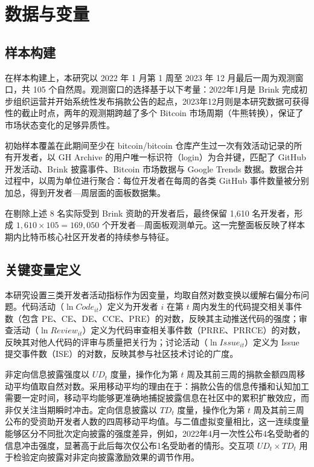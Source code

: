 \documentclass[
    type = master, %
    degree = professional,        %
    decl-page,  %
    twoside,                %
    fontset = fandol %
  ]{njuthesis}
\begin{document}
\section{数据与变量}
\label{sec:data-1}

\subsection{样本构建}

在样本构建上，本研究以 2022 年 1 月第 1 周至 2023 年 12 月最后一周为观测窗口，共 105 个自然周。观测窗口的选择基于以下考量：2022年1月是 Brink 完成初步组织运营并开始系统性发布捐款公告的起点，2023年12月则是本研究数据可获得性的截止时点，两年的观测期跨越了多个 Bitcoin 市场周期（牛熊转换），保证了市场状态变化的足够异质性。

初始样本覆盖在此期间至少在 bitcoin/bitcoin 仓库产生过一次有效活动记录的所有开发者，以 GH Archive 的用户唯一标识符（login）为合并键，匹配了 GitHub 开发活动、Brink 披露事件、Bitcoin 市场数据与 Google Trends 数据。数据合并过程中，以周为单位进行聚合：每位开发者在每周的各类 GitHub 事件数量被分别加总，得到开发者—周层面的面板数据集。

在剔除上述 8 名实际受到 Brink 资助的开发者后，最终保留 1,610 名开发者，形成 $1{,}610 \times 105 = 169{,}050$ 个开发者—周面板观测单元。这一完整面板反映了样本期内比特币核心社区开发者的持续参与特征。

\subsection{关键变量定义}

本研究设置三类开发者活动指标作为因变量，均取自然对数变换以缓解右偏分布问题。代码活动（$\ln\mathit{Code}_{it}$）定义为开发者 $i$ 在第 $t$ 周内发生的代码提交相关事件数（包含 PE、CE、DE、CCE、PRE）的对数，反映其主动推送代码的强度；审查活动（$\ln\mathit{Review}_{it}$）定义为代码审查相关事件数（PRRE、PRRCE）的对数，反映其对他人代码的评审与质量把关行为；讨论活动（$\ln\mathit{Issue}_{it}$）定义为 Issue 提交事件数（ISE）的对数，反映其参与社区技术讨论的广度。

非定向信息披露强度以 $\mathit{UD}_t$ 度量，操作化为第 $t$ 周及其前三周的捐款金额四周移动平均值取自然对数。采用移动平均的理由在于：捐款公告的信息传播和认知加工需要一定时间，移动平均能够更准确地捕捉披露信息在社区中的累积扩散效应，而非仅关注当期瞬时冲击。定向信息披露以 $\mathit{TD}_t$ 度量，操作化为第 $t$ 周及其前三周公布的受资助开发者人数的四周移动平均值。与二值虚拟变量相比，这一连续度量能够区分不同批次定向披露的强度差异，例如，2022年4月一次性公布4名受助者的信息冲击强度，显著高于此后每次仅公布1名受助者的情形。交互项 $\mathit{UD}_t \times \mathit{TD}_t$ 用于检验定向披露对非定向披露激励效果的调节作用。
\end{document}
